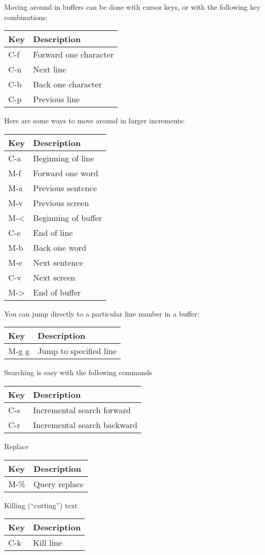 Moving around in buffers can be done with cursor keys, or with the
following key combinations:

\begin{longtable}[]{ll}
\toprule
Key & Description\tabularnewline
\midrule
\endhead
C-f & Forward one character\tabularnewline
C-n & Next line\tabularnewline
C-b & Back one character\tabularnewline
C-p & Previous line\tabularnewline
\bottomrule
\end{longtable}

Here are some ways to move around in larger increments:

\begin{longtable}[]{ll}
\toprule
Key & Description\tabularnewline
\midrule
\endhead
C-a & Beginning of line\tabularnewline
M-f & Forward one word\tabularnewline
M-a & Previous sentence\tabularnewline
M-v & Previous screen\tabularnewline
M-\textless{} & Beginning of buffer\tabularnewline
C-e & End of line\tabularnewline
M-b & Back one word\tabularnewline
M-e & Next sentence\tabularnewline
C-v & Next screen\tabularnewline
M-\textgreater{} & End of buffer\tabularnewline
\bottomrule
\end{longtable}

You can jump directly to a particular line number in a buffer:

\begin{longtable}[]{ll}
\toprule
Key & Description\tabularnewline
\midrule
\endhead
M-g g & Jump to specified line\tabularnewline
\bottomrule
\end{longtable}

Searching is easy with the following commands

\begin{longtable}[]{ll}
\toprule
Key & Description\tabularnewline
\midrule
\endhead
C-s & Incremental search forward\tabularnewline
C-r & Incremental search backward\tabularnewline
\bottomrule
\end{longtable}

Replace

\begin{longtable}[]{ll}
\toprule
Key & Description\tabularnewline
\midrule
\endhead
M-\% & Query replace\tabularnewline
\bottomrule
\end{longtable}

Killing (``cutting'') text

\begin{longtable}[]{ll}
\toprule
Key & Description\tabularnewline
\midrule
\endhead
C-k & Kill line\tabularnewline
\bottomrule
\end{longtable}

